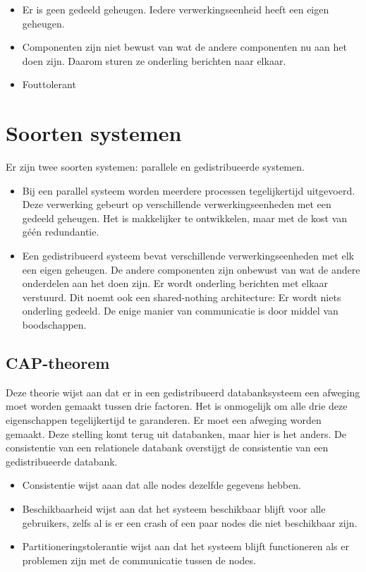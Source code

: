 \documentclass[a4paper,10pt,twoside]{report}
\begin{document}
\begin{itemize}
	\item Er is geen gedeeld geheugen. Iedere verwerkingseenheid heeft een eigen geheugen.
	\item Componenten zijn niet bewust van wat de andere componenten nu aan het doen zijn. Daarom sturen ze onderling berichten naar elkaar.
	\item Fouttolerant
\end{itemize}

\section{Soorten systemen}

Er zijn twee soorten systemen: parallele en gedistribueerde systemen.

\begin{itemize}
	\item Bij een parallel systeem worden meerdere processen tegelijkertijd uitgevoerd. Deze verwerking gebeurt op verschillende verwerkingseenheden met een gedeeld geheugen. Het is makkelijker te ontwikkelen, maar met de kost van géén redundantie.
	\item Een gedistribueerd systeem bevat verschillende verwerkingseenheden met elk een eigen geheugen. De andere componenten zijn onbewust van wat de andere onderdelen aan het doen zijn. Er wordt onderling berichten met elkaar verstuurd. Dit noemt ook een shared-nothing architecture: Er wordt niets onderling gedeeld. De enige manier van communicatie is door middel van boodschappen.
\end{itemize}

\subsection{CAP-theorem}

Deze theorie wijst aan dat er in een gedistribueerd databanksysteem een afweging moet worden gemaakt tussen drie factoren. Het is onmogelijk om alle drie deze eigenschappen tegelijkertijd te garanderen. Er moet een afweging worden gemaakt. Deze stelling komt terug uit databanken, maar hier is het anders. De consistentie van een relationele databank overstijgt de consistentie van een gedistribueerde databank.

\begin{itemize}
	\item Consistentie wijst aaan dat alle nodes dezelfde gegevens hebben.
	\item Beschikbaarheid wijst aan dat het systeem beschikbaar blijft voor alle gebruikers, zelfs al is er een crash of een paar nodes die niet beschikbaar zijn.
	\item Partitioneringstolerantie wijst aan dat het systeem blijft functioneren als er problemen zijn met de communicatie tussen de nodes.
\end{itemize}
\end{document}
